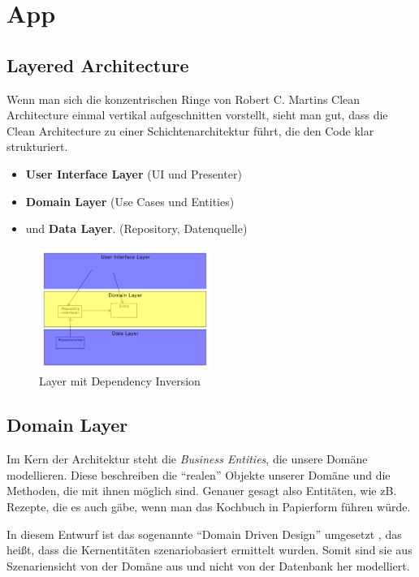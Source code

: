 \section{App}


\subsection{Layered Architecture}

Wenn man sich die konzentrischen Ringe von Robert C. Martins Clean Architecture einmal vertikal aufgeschnitten vorstellt, sieht man gut, dass die Clean Architecture zu einer Schichtenarchitektur führt, die den Code klar strukturiert.


\begin{itemize}
\item {\textbf{User Interface Layer}} (UI und Presenter)
\item {\textbf{Domain Layer}}  (Use Cases und Entities)
\item und {\textbf{Data Layer}}. (Repository, Datenquelle)
\end{itemize}


\begin{figure}[H]
\centering
\includegraphics[width=0.5\textwidth]{pics/layers.pdf}%
\caption{Layer mit Dependency Inversion}%
\label{cleanarch}%
\end{figure}

\subsection{Domain Layer} 
Im Kern der Architektur steht die {\em Business Entities}, die unsere Domäne modellieren.
Diese beschreiben die "`realen"' Objekte unserer Domäne und die Methoden, die mit ihnen möglich sind. Genauer gesagt also Entitäten, wie zB. Rezepte, die es auch gäbe, wenn man das Kochbuch in Papierform führen würde. 


In diesem Entwurf ist das sogenannte "`Domain Driven Design"' umgesetzt \cite{CleanArchitecture} \cite{DomainDrivenDesign}, das heißt, dass die Kernentitäten szenariobasiert ermittelt wurden. Somit sind sie aus Szenariensicht von der Domäne aus und nicht von der Datenbank her modelliert.


